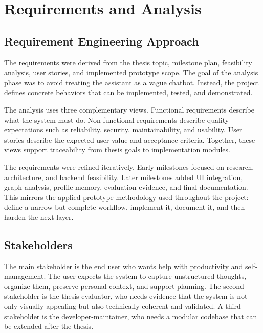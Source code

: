 \chapter{Requirements and Analysis}

\section{Requirement Engineering Approach}

The requirements were derived from the thesis topic, milestone plan, feasibility analysis, user stories, and implemented prototype scope. The goal of the analysis phase was to avoid treating the assistant as a vague chatbot. Instead, the project defines concrete behaviors that can be implemented, tested, and demonstrated.

The analysis uses three complementary views. Functional requirements describe what the system must do. Non-functional requirements describe quality expectations such as reliability, security, maintainability, and usability. User stories describe the expected user value and acceptance criteria. Together, these views support traceability from thesis goals to implementation modules.

The requirements were refined iteratively. Early milestones focused on research, architecture, and backend feasibility. Later milestones added UI integration, graph analysis, profile memory, evaluation evidence, and final documentation. This mirrors the applied prototype methodology used throughout the project: define a narrow but complete workflow, implement it, document it, and then harden the next layer.

\section{Stakeholders}

The main stakeholder is the end user who wants help with productivity and self-management. The user expects the system to capture unstructured thoughts, organize them, preserve personal context, and support planning. The second stakeholder is the thesis evaluator, who needs evidence that the system is not only visually appealing but also technically coherent and validated. A third stakeholder is the developer-maintainer, who needs a modular codebase that can be extended after the thesis.

